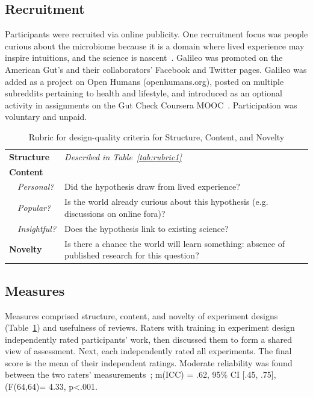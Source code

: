 \subsection*{Recruitment}
Participants were recruited via online publicity. One recruitment focus was people curious about the microbiome because it is a domain where lived experience may inspire intuitions, and the science is nascent~\cite{McDonald2018a}. Galileo was promoted on the American Gut's and their collaborators' Facebook and Twitter pages. Galileo was added as a project on Open Humans (openhumans.org), posted on multiple subreddits pertaining to health and lifestyle, and introduced as an optional activity in assignments on the Gut Check Coursera MOOC~\cite{Knight2016}. Participation was voluntary and unpaid. 


\vspace{0.25in}
\begin{table}[!ht]
\caption[Rubric for design-quality criteria for Structure, Content, and Novelty]
{Rubric for design-quality criteria for Structure, Content, and Novelty}


\vspace{-0.25in}
\begin{center}
\renewcommand{\arraystretch}{1.5}
\begin{tabular}{p{1.5in}p{4in}}
\hline
\textbf{Structure} &  \textit{Described in Table~\ref{tab:rubric1}} \\
\textbf{Content}  & \\
~~\textit{Personal?} & Did the hypothesis draw from lived experience? \\
~~\textit{Popular?} & Is the world already curious about this hypothesis (e.g. discussions on online fora)?  \\
~~\textit{Insightful?} & Does the hypothesis link to existing science?  \\
\textbf{Novelty}  &  Is there a chance the world will learn something: absence of published research for this question?\\
\hline
\end{tabular}
\end{center}
\label{tab:rubric2}
\end{table}

\subsection*{Measures}
Measures comprised structure, content, and novelty of experiment designs (Table~\ref{tab:rubric2}) and usefulness of reviews. Raters with training in experiment design independently rated participants' work, then discussed them to form a shared view of assessment. Next, each independently rated all experiments. The final score is the mean of their independent ratings. Moderate reliability was found between the two raters' measurements~\cite{koo2016guideline}; m(ICC) = .62, 95\% CI [.45, .75], (F(64,64)= 4.33, p<.001. 

